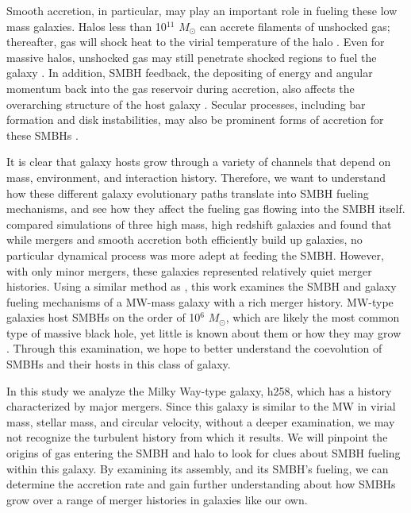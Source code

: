 \documentclass[]{emulateapj}
\begin{document}
Smooth accretion, in particular, may play an important role in fueling these low mass galaxies. Halos less than 10$^{11}$ $M_{\odot}$ can accrete filaments of unshocked gas; thereafter, gas will shock heat to the virial temperature of the halo \citep{Keres2005}. Even for massive halos, unshocked gas may still penetrate shocked regions to fuel the galaxy \citep{Brooks2009,Dekel2009,Nelson2013}. In addition, SMBH feedback, the depositing of energy and angular momentum back into the gas reservoir during accretion, also affects the overarching structure of the host galaxy \citep{Governato2009a}. Secular processes, including bar formation and disk instabilities, may also be prominent forms of accretion for these SMBHs \citep{Athanassoula2016,Kormendy2013}. 

It is clear that galaxy hosts grow through a variety of channels that depend on mass, environment, and interaction history. Therefore, we want to understand how these different galaxy evolutionary paths translate into SMBH fueling mechanisms, and see how they affect the fueling gas flowing into the SMBH itself. \cite{Bellovary2013} compared simulations of three high mass, high redshift galaxies and found that while mergers and smooth accretion both efficiently build up galaxies, no particular dynamical process was more adept at feeding the SMBH. However, with only minor mergers, these galaxies represented relatively quiet merger histories. Using a similar method as \cite{Bellovary2013}, this work examines the SMBH and galaxy fueling mechanisms of a MW-mass galaxy with a rich merger history. MW-type galaxies host SMBHs on the order of 10$^6$ $M_{\odot}$, which are likely the most common type of massive black hole, yet little is known about them or how they may grow \citep{Kormendy2013}. Through this examination, we hope to better understand the coevolution of SMBHs and their hosts in this class of galaxy. 

In this study we analyze the Milky Way-type galaxy, h258, which has a history characterized by major mergers. Since this galaxy is similar to the MW in virial mass, stellar mass, and circular velocity, without a deeper examination, we may not recognize the turbulent history from which it results. We will pinpoint the origins of gas entering the SMBH and halo to look for clues about SMBH fueling within this galaxy. By examining its assembly, and its SMBH's fueling, we can determine the accretion rate and gain further understanding about how SMBHs grow over a range of merger histories in galaxies like our own.
\end{document}
